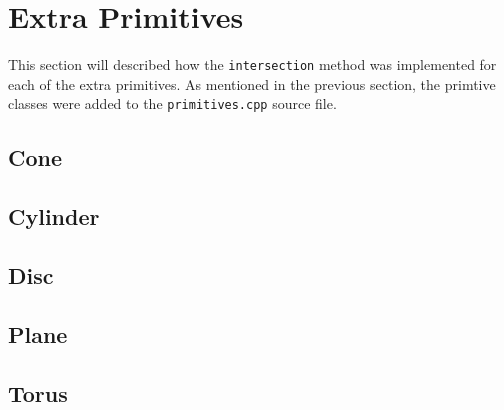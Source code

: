 \section{Extra Primitives}

This section will described how the \verb|intersection| method was
implemented for each of the extra primitives. As mentioned in the previous
section, the primtive classes were added to the \verb|primitives.cpp| source 
file.

\subsection*{Cone}
\lipsum[1]

\subsection*{Cylinder}

\subsection*{Disc}

\subsection*{Plane}

\subsection*{Torus}

